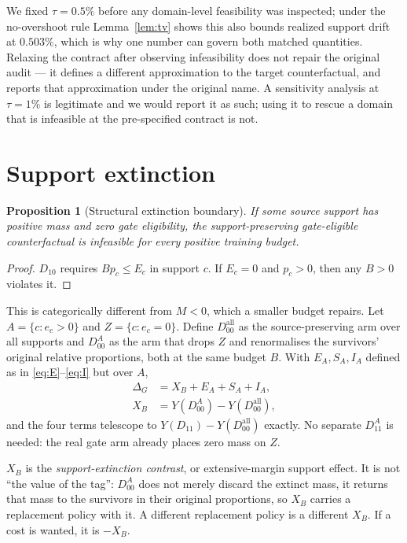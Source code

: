 \documentclass[10pt,twocolumn]{article}
\newtheorem{proposition}{Proposition}
\begin{document}
We fixed $\tau=0.5\%$ before any domain-level feasibility was inspected; under the no-overshoot
rule Lemma~\ref{lem:tv} shows this also bounds realized support drift at $0.503\%$, which is why
one number can govern both matched quantities. Relaxing the contract after observing
infeasibility does not repair the original audit --- it defines a different approximation to the
target counterfactual, and reports that approximation under the original name. A sensitivity
analysis at $\tau=1\%$ is legitimate and we would report it as such; using it to rescue a domain
that is infeasible at the pre-specified contract is not.

\section{Support extinction}
\label{sec:extinction}

\begin{proposition}[Structural extinction boundary]
\label{prop:ext}
If some source support has positive mass and zero gate eligibility, the support-preserving
gate-eligible counterfactual is infeasible for every positive training budget.
\end{proposition}

\begin{proof}
$D_{10}$ requires $B p_c \le E_c$ in support $c$. If $E_c=0$ and $p_c>0$, then any $B>0$
violates it.
\end{proof}

This is categorically different from $M<0$, which a smaller budget repairs. Let
$A=\{c: e_c>0\}$ and $Z=\{c: e_c=0\}$. Define $D_{00}^{\mathrm{all}}$ as the source-preserving
arm over all supports and $D_{00}^{A}$ as the arm that drops $Z$ and renormalises the
survivors' original relative proportions, both at the same budget $B$. With
$E_A,S_A,I_A$ defined as in \eqref{eq:E}--\eqref{eq:I} but over $A$,
\begin{align}
\Delta_G &= X_B + E_A + S_A + I_A, \label{eq:X}\\
X_B &= Y(D_{00}^{A}) - Y(D_{00}^{\mathrm{all}}), \nonumber
\end{align}
and the four terms telescope to $Y(D_{11})-Y(D_{00}^{\mathrm{all}})$ exactly. No separate
$D_{11}^{A}$ is needed: the real gate arm already places zero mass on $Z$.

$X_B$ is the \emph{support-extinction contrast}, or extensive-margin support effect. It is not
``the value of the tag'': $D_{00}^{A}$ does not merely discard the extinct mass, it returns
that mass to the survivors in their original proportions, so $X_B$ carries a replacement policy
with it. A different replacement policy is a different $X_B$. If a cost is wanted, it is $-X_B$.
\end{document}
